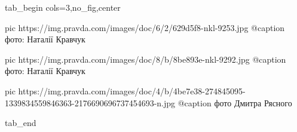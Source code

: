  
 
 
 
 

\ifcmt
  tab_begin cols=3,no_fig,center

     pic https://img.pravda.com/images/doc/6/2/629d5f8-nkl-9253.jpg
		 @caption фото: Наталії Кравчук

		 pic https://img.pravda.com/images/doc/8/b/8be893e-nkl-9292.jpg
		 @caption фото: Наталії Кравчук

		 pic https://img.pravda.com/images/doc/4/b/4be7e38-274845095-1339834559846363-2176690696737454693-n.jpg
		 @caption фото Дмитра Рясного

  tab_end
\fi
